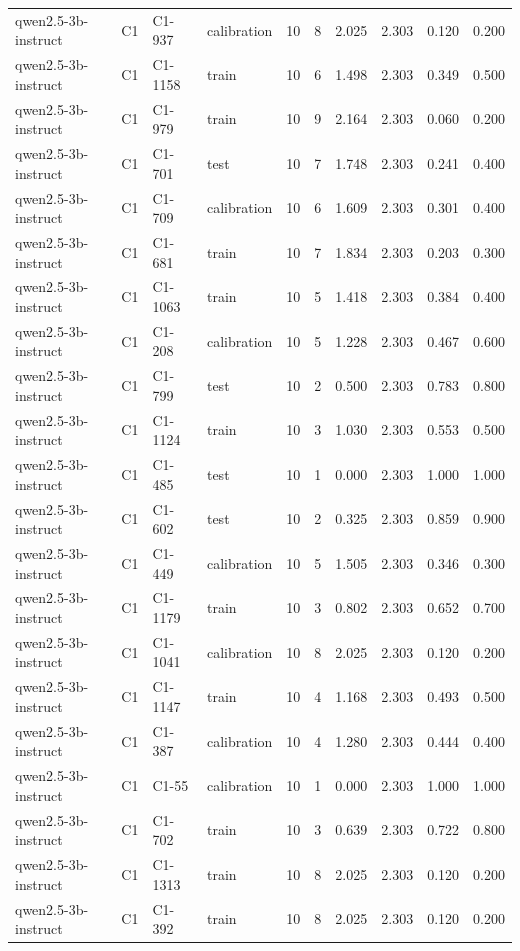 \begin{table}
\begin{tabular}{llllrrrrrr}
qwen2.5-3b-instruct & C1 & C1-937 & calibration & 10 & 8 & 2.025 & 2.303 & 0.120 & 0.200 \\
qwen2.5-3b-instruct & C1 & C1-1158 & train & 10 & 6 & 1.498 & 2.303 & 0.349 & 0.500 \\
qwen2.5-3b-instruct & C1 & C1-979 & train & 10 & 9 & 2.164 & 2.303 & 0.060 & 0.200 \\
qwen2.5-3b-instruct & C1 & C1-701 & test & 10 & 7 & 1.748 & 2.303 & 0.241 & 0.400 \\
qwen2.5-3b-instruct & C1 & C1-709 & calibration & 10 & 6 & 1.609 & 2.303 & 0.301 & 0.400 \\
qwen2.5-3b-instruct & C1 & C1-681 & train & 10 & 7 & 1.834 & 2.303 & 0.203 & 0.300 \\
qwen2.5-3b-instruct & C1 & C1-1063 & train & 10 & 5 & 1.418 & 2.303 & 0.384 & 0.400 \\
qwen2.5-3b-instruct & C1 & C1-208 & calibration & 10 & 5 & 1.228 & 2.303 & 0.467 & 0.600 \\
qwen2.5-3b-instruct & C1 & C1-799 & test & 10 & 2 & 0.500 & 2.303 & 0.783 & 0.800 \\
qwen2.5-3b-instruct & C1 & C1-1124 & train & 10 & 3 & 1.030 & 2.303 & 0.553 & 0.500 \\
qwen2.5-3b-instruct & C1 & C1-485 & test & 10 & 1 & 0.000 & 2.303 & 1.000 & 1.000 \\
qwen2.5-3b-instruct & C1 & C1-602 & test & 10 & 2 & 0.325 & 2.303 & 0.859 & 0.900 \\
qwen2.5-3b-instruct & C1 & C1-449 & calibration & 10 & 5 & 1.505 & 2.303 & 0.346 & 0.300 \\
qwen2.5-3b-instruct & C1 & C1-1179 & train & 10 & 3 & 0.802 & 2.303 & 0.652 & 0.700 \\
qwen2.5-3b-instruct & C1 & C1-1041 & calibration & 10 & 8 & 2.025 & 2.303 & 0.120 & 0.200 \\
qwen2.5-3b-instruct & C1 & C1-1147 & train & 10 & 4 & 1.168 & 2.303 & 0.493 & 0.500 \\
qwen2.5-3b-instruct & C1 & C1-387 & calibration & 10 & 4 & 1.280 & 2.303 & 0.444 & 0.400 \\
qwen2.5-3b-instruct & C1 & C1-55 & calibration & 10 & 1 & 0.000 & 2.303 & 1.000 & 1.000 \\
qwen2.5-3b-instruct & C1 & C1-702 & train & 10 & 3 & 0.639 & 2.303 & 0.722 & 0.800 \\
qwen2.5-3b-instruct & C1 & C1-1313 & train & 10 & 8 & 2.025 & 2.303 & 0.120 & 0.200 \\
qwen2.5-3b-instruct & C1 & C1-392 & train & 10 & 8 & 2.025 & 2.303 & 0.120 & 0.200 \\

\end{tabular}
\end{table}

